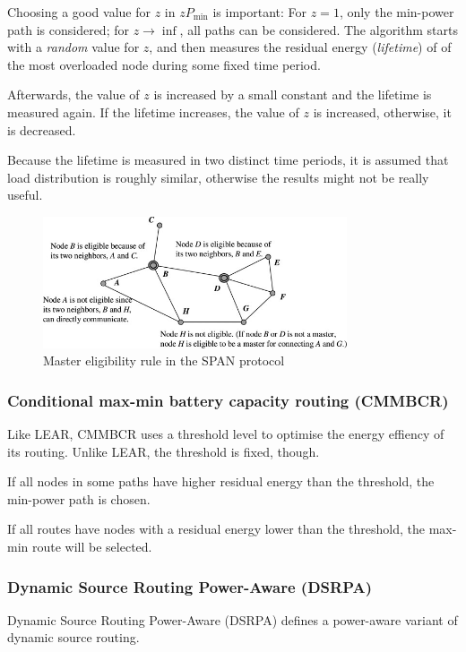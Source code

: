 Choosing a good value for $z$ in $zP_{\min}$ is important: For $z=1$, only
the min-power path is considered; for $z \to \inf$, all paths can be
considered. The algorithm starts with a \textit{random} value for $z$, and
then measures the residual energy (\textit{lifetime}) of of the most overloaded node during some
fixed time period.

 Afterwards, the value of $z$ is increased by a small constant
 and the lifetime is measured again. If the lifetime increases, the value of $z$
is increased, otherwise, it is decreased.

Because the lifetime is measured
in two distinct time periods, it is assumed that load distribution is roughly
similar, otherwise the results might not be really useful.
\begin{figure}
\centering
\includegraphics[width=0.8\textwidth]{images/span-master-example}
\caption{Master eligibility rule in the SPAN protocol\cite{alotaibi2012survey}}
\label{spanmaster}
\end{figure}
\subsubsection{Conditional max-min battery capacity routing (CMMBCR)}
Like LEAR, CMMBCR\cite{toh2001maximum} uses a threshold level to optimise
the energy effiency of its routing.
Unlike LEAR, the threshold is fixed, though.

If all nodes in some paths have higher residual energy than the threshold,
the min-power path is chosen.

If all routes have nodes with a residual energy lower than the threshold, the
max-min route will be selected.

\subsubsection{Dynamic Source Routing Power-Aware (DSRPA)}
\label{dsrpa}
Dynamic Source Routing Power-Aware (DSRPA)\cite{djenouri2006new} defines a
power-aware variant of dynamic source routing.

